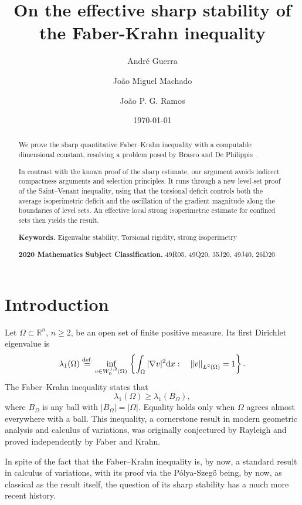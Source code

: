 \documentclass[11pt]{amsart}
\title[Effective Quantitative stability of Faber-Krahn]{On the effective sharp
stability of the Faber-Krahn inequality}
\author{Andr\'e Guerra}
\author{Jo\~ao Miguel Machado}
\author{Jo\~ao P. G. Ramos}
\date{\today}
\theoremstyle{plain}
\theoremstyle{definition}
\newcommand{\eqdef}{\overset{\text{def.}}{=}}
\def\dd{{\rm d}}
\newcommand{\norm}[1]{\left\lVert#1\right\rVert}
\begin{document}
\raggedbottom

\begin{abstract}
We prove the sharp quantitative Faber--Krahn inequality with a computable dimensional constant, resolving a problem posed by Brasco and De Philippis~\cite[Open Problem~2]{brasco2017spectral}.

In contrast with the known proof of the sharp estimate, our argument avoids indirect compactness arguments and selection principles. It runs through a new level-set proof of the Saint--Venant inequality, using that the torsional deficit controls both the average isoperimetric deficit and the oscillation of the gradient magnitude along the boundaries of level sets. An effective local strong isoperimetric estimate for confined sets then yields the result.


 \bigskip

\noindent\textbf{Keywords.} 
Eigenvalue stability, Torsional rigidity, strong isoperimetry


\noindent\textbf{2020 Mathematics Subject Classification.}
49R05, 49Q20, 35J20, 49J40, 26D20
\\ 
\end{abstract}

\maketitle


\section{Introduction}
Let $\Omega\subset\mathbb R^n$, $n\ge2$, be an open set of finite positive
measure. Its first Dirichlet eigenvalue is
\[
  \lambda_1(\Omega)
  \eqdef
  \inf_{
    \substack{
        v\in W_0^{1,2}(\Omega)
    } \, 
  }
  \left\{
  \displaystyle
  \int_\Omega |\nabla v|^2\dd x: 
  \quad 
  \norm{v}_{L^2(\Omega)} = 1
  \right\}.
\]
The Faber--Krahn inequality states that
\[
  \lambda_1(\Omega)\ge \lambda_1(B_\Omega),
\]
where $B_\Omega$ is any ball with $|B_\Omega|=|\Omega|$. Equality holds only
when $\Omega$ agrees almost everywhere with a ball.
 This inequality, a cornerstone result in modern geometric analysis and calculus of variations, was originally conjectured by Rayleigh and proved
independently by Faber and Krahn.

In spite of the fact that the Faber--Krahn inequality is, by now, a standard result in calculus of variations, with its proof via the P\'olya-Szeg\H{o} being, by now, as classical as the result itself, the question of its sharp stability has a much more recent history.
\end{document}
